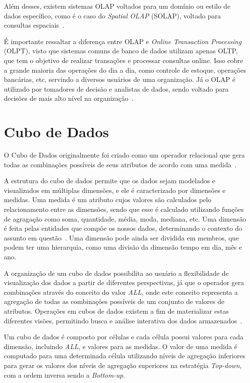 Além desses, existem sistemas OLAP voltados para um domínio ou estilo de dados específico, como é o caso do \textit{Spatial OLAP} (SOLAP), voltado para consultas espaciais~\cite{viswanathanUsercentricSpatialData2014}.

É importante ressaltar a diferença entre OLAP e \textit{Online Transaction Processing} (OLPT), visto que sistemas comuns de banco de dados utilizam apenas OLTP, que tem o objetivo de realizar transações e processar consultas online.
Isso cobre a grande maioria das operações do dia a dia, como controle de estoque, operações bancárias, etc, servindo a diversos usuários de uma organização.
Já o OLAP é utilizado por tomadores de decisão e analistas de dados, sendo voltado para decisões de mais alto nível na organização~\cite{hanDataMiningConcepts2011}.

\section{Cubo de Dados}
\label{ch:fun:cube}

O Cubo de Dados originalmente foi criado como um operador relacional que gera todas as combinações possíveis de seus atributos de acordo com uma medida~\cite{grayDataCubeRelational1996}.

A estrutura do cubo de dados permite que os dados sejam modelados e visualizados em múltiplas dimensões, e ele é caracterizado por dimensões e medidas.
Uma medida é um atributo cujos valores são calculados pelo relacionamento entre as dimensões, sendo que esse é calculado utilizando funções de agragação como soma, quantidade, média, moda, mediana, etc.
Uma dimensão é feita pelas entidades que compõe os nossos dados, determinando o contexto do assunto em questão~\cite{hanDataMiningConcepts2011}.
Uma dimensão pode ainda ser dividida em membros, que podem ter uma hierarquia, como uma divisão da dimensão tempo em dia, mês e ano.

A organização de um cubo de dados possibilita ao usuário a flexibilidade de visualização dos dados a partir de diferentes perspectivas, já que o operador gera combinações através do conceito do valor \textit{ALL}, onde este conceito representa a agregação de todas as combinações possíveis de um conjunto de valores de atributos.
Operações em cubos de dados existem a fim de materializar estas diferentes visões, permitindo busca e análise interativa dos dados armazenados~\cite{hanDataMiningConcepts2011}.

Um cubo de dados é composto por células e cada célula possui valores para cada dimensão, incluindo \textit{ALL}, e valores para as medidas.
O valor de uma medida é computado para uma determinada célula utilizando níveis de agregação inferiores para gerar os valores dos níveis de agregação superiores na estratégia \textit{Top-down}, com a ordem inversa sendo a \textit{Bottom-up}.

